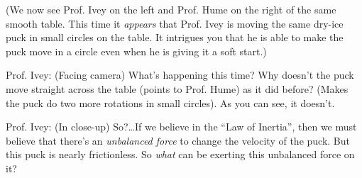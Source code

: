 \documentclass[a6paper]{article}
\begin{document}
(We now see Prof. Ivey on the left and Prof. Hume on the right of the same smooth table. This time it \emph{appears} that Prof. Ivey is moving the same dry-ice puck in small circles on the table. It intrigues you that he is able to make the puck move in a circle even when he is giving it a soft start.)

Prof. Ivey: (Facing camera) What's happening this time? Why doesn't the puck move straight across the table (points to Prof. Hume) as it did before? (Makes the puck do two more rotations in small circles). As you can see, it doesn't. 

Prof. Ivey: (In close-up) So?\dots\space If we believe in the ``Law of Inertia'', then we must believe that there's an \emph{unbalanced force} to change the velocity of the puck. But this puck is nearly frictionless. So \emph{what} can be exerting this unbalanced force on it?
\end{document}
